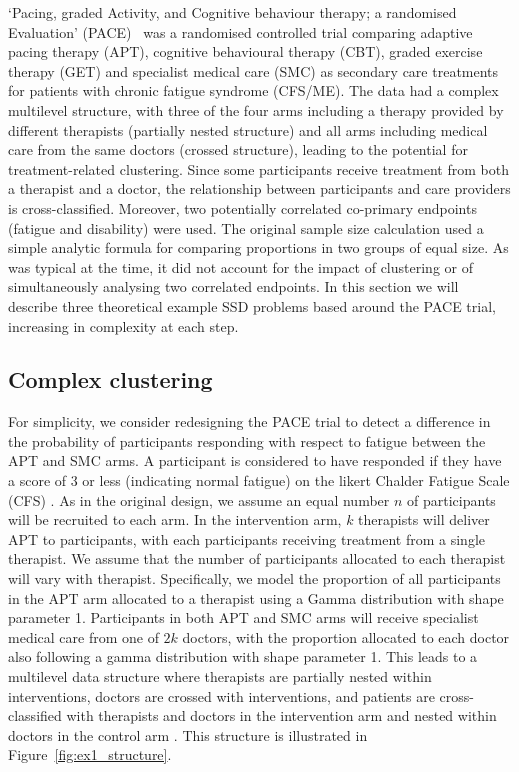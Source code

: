 \documentclass{article}
\begin{document}
`Pacing, graded Activity, and Cognitive behaviour therapy; a randomised Evaluation' (PACE)~\cite{White2007, White2011} was a randomised controlled trial comparing adaptive pacing therapy (APT), cognitive behavioural therapy (CBT), graded exercise therapy (GET) and specialist medical care (SMC) as secondary care treatments for patients with chronic fatigue syndrome (CFS/ME). The data had a complex multilevel structure, with three of the four arms including a therapy provided by different therapists (partially nested structure) and all arms including medical care from the same doctors (crossed structure), leading to the potential for treatment-related clustering. Since some participants receive treatment from both a therapist and a doctor, the relationship between participants and care providers is cross-classified. Moreover, two potentially correlated co-primary endpoints (fatigue and disability) were used. The original sample size calculation used a simple analytic formula for comparing proportions in two groups of equal size. As was typical at the time, it did not account for the impact of clustering or of simultaneously analysing two correlated endpoints. In this section we will describe three theoretical example SSD problems based around the PACE trial, increasing in complexity at each step. 

\subsection{Complex clustering}\label{sec:ex1}

For simplicity, we consider redesigning the PACE trial to detect a difference in the probability of participants responding with respect to fatigue between the APT and SMC arms. A participant is considered to have responded if they have a score of 3 or less (indicating normal fatigue) on the likert Chalder Fatigue Scale (CFS) \cite{Chalder1993}. As in the original design, we assume an equal number $n$ of participants will be recruited to each arm. In the intervention arm, $k$ therapists will deliver APT to participants, with each participants receiving treatment from a single therapist. We assume that the number of participants allocated to each therapist will vary with therapist. Specifically, we model the proportion of all participants in the APT arm allocated to a therapist using a Gamma distribution with shape parameter 1. Participants in both APT and SMC arms will receive specialist medical care from one of $2k$ doctors, with the proportion allocated to each doctor also following a gamma distribution with shape parameter 1. This leads to a multilevel data structure where therapists are partially nested within interventions, doctors are crossed with interventions, and patients are cross-classified with therapists and doctors in the intervention arm and nested within doctors in the control arm \cite{Walwyn2010}. This structure is illustrated in Figure~\ref{fig:ex1_structure}.
\end{document}
